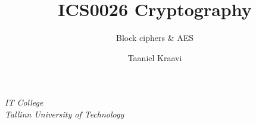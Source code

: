 

\usepackage{cryslides}
\usepackage{crygame}

\usepackage{soul}

\usetikzlibrary{positioning,calc}

\graphicspath{ {../../images/} }

\title{ICS0026 Cryptography}
\subtitle{Block ciphers \& AES}
\date{}
\author{Taaniel Kraavi}
\institute%
{%
  \textit{IT College}\\
  \textit{Tallinn University of Technology}
}


\begin{frame}
  \titlepage
\end{frame}

